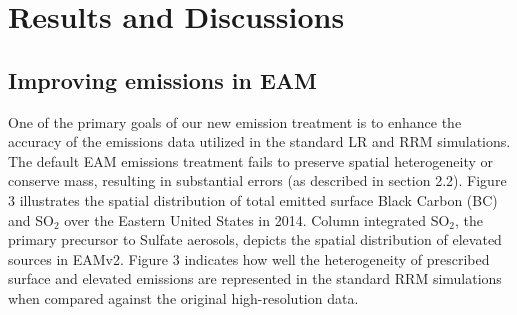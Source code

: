 \section{Results and Discussions}

\subsection{Improving emissions in EAM}

One of the primary goals of our new emission treatment is to enhance the accuracy of the emissions data utilized in the standard LR and RRM simulations. The default EAM emissions treatment fails to preserve spatial heterogeneity or conserve mass, resulting in substantial errors (as described in section 2.2). Figure 3 illustrates the spatial distribution of total emitted surface Black Carbon (BC) and SO$_2$ over the Eastern United States in 2014. Column integrated SO$_2$, the primary precursor to Sulfate aerosols, depicts the spatial distribution of elevated sources in EAMv2. Figure 3 indicates how well the heterogeneity of prescribed surface and elevated emissions are represented in the standard RRM simulations when compared against the original high-resolution data.


